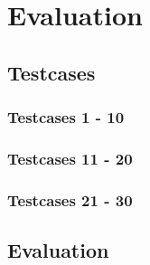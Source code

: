 \chapter{Evaluation}
\label{chap_evaluation}

\section{Testcases}

\subsection{Testcases 1 - 10}

\subsection{Testcases 11 - 20}

\subsection{Testcases 21 - 30}

\section{Evaluation}